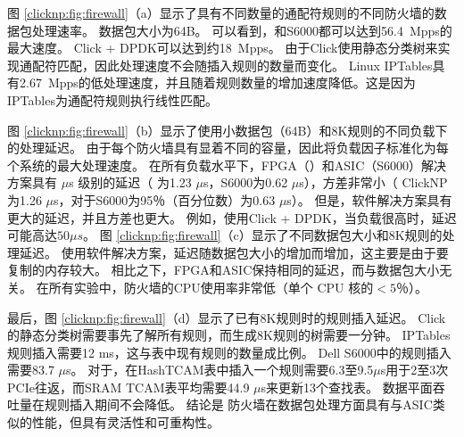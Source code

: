 图 \ref {clicknp:fig:firewall}（a）显示了具有不同数量的通配符规则的不同防火墙的数据包处理速率。
数据包大小为64B。
可以看到，\name 和S6000都可以达到56.4~Mpps的最大速度。
Click + DPDK可以达到约18~Mpps。
由于Click使用静态分类树来实现通配符匹配，因此处理速度不会随插入规则的数量而变化。
Linux IPTables具有2.67~Mpps的低处理速度，并且随着规则数量的增加速度降低。这是因为IPTables为通配符规则执行线性匹配。

图 \ref {clicknp:fig:firewall}（b）显示了使用小数据包（64B）和8K规则的不同负载下的处理延迟。
由于每个防火墙具有显着不同的容量，因此将负载因子标准化为每个系统的最大处理速度。
在所有负载水平下，FPGA（\name{}）和ASIC（S6000）解决方案具有 $\mu$s 级别的延迟（\name{} 为1.23 $\mu$s，S6000为0.62 $\mu$s），方差非常小（ ClickNP为1.26 $\mu$s，对于S6000为95％（百分位数）为0.63 $\mu$s）。
但是，软件解决方案具有更大的延迟，并且方差也更大。
例如，使用Click + DPDK，当负载很高时，延迟可能高达$ 50 \mu{}s $。
图 \ref {clicknp:fig:firewall}（c）显示了不同数据包大小和8K规则的处理延迟。
使用软件解决方案，延迟随数据包大小的增加而增加，这主要是由于要复制的内存较大。
相比之下，FPGA和ASIC保持相同的延迟，而与数据包大小无关。
在所有实验中，\name 防火墙的CPU使用率非常低（单个 CPU 核的$ <5 ％$）。

最后，图 \ref {clicknp:fig:firewall}（d）显示了已有8K规则时的规则插入延迟。 Click的静态分类树需要事先了解所有规则，而生成8K规则的树需要一分钟。
IPTables规则插入需要12 ms，这与表中现有规则的数量成比例。
Dell S6000中的规则插入需要83.7 $\mu$s。
对于\name{}，在HashTCAM表中插入一个规则需要6.3至9.5$\mu$s用于2至3次PCIe往返，而SRAM TCAM表平均需要44.9 $\mu$s来更新13个查找表。
\name 数据平面吞吐量在规则插入期间不会降低。
结论是 \name{} 防火墙在数据包处理方面具有与ASIC类似的性能，但具有灵活性和可重构性。


